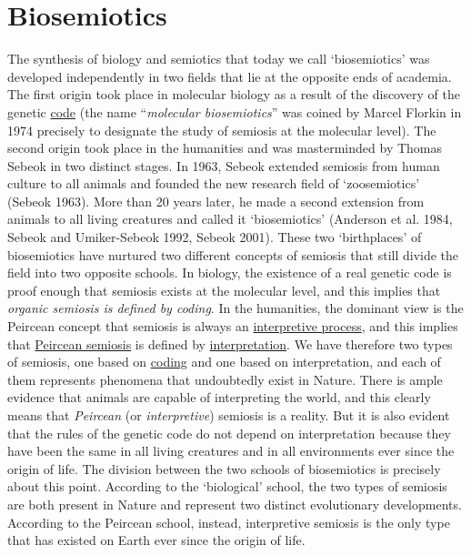 \documentclass[12pt]{article}
\begin{document}
\section{Biosemiotics}
The synthesis of biology and semiotics that today we call `biosemiotics' was developed independently in two fields that lie at the opposite ends of academia. The first origin took place in molecular biology as a result of the discovery of the genetic \hyperlink{code}{code} (the name ``\textit{molecular biosemiotics}'' was coined by Marcel Florkin in 1974 precisely to designate the study of semiosis at the molecular level). The second origin took place in the humanities and was masterminded by Thomas Sebeok in two distinct stages. In 1963, Sebeok extended semiosis from human culture to all animals and founded the new research field of `zoosemiotics' (Sebeok 1963). More than 20 years later, he made a second extension from animals to all living creatures and called it `biosemiotics' (Anderson et al. 1984, Sebeok and Umiker-Sebeok 1992, Sebeok 2001). These two `birthplaces' of biosemiotics have nurtured two different concepts of semiosis that still divide the field into two opposite schools. In biology, the existence of a real genetic code is proof enough that semiosis exists at the molecular level, and this implies that \textit{organic semiosis is defined by coding}. In the humanities, the dominant view is the Peircean concept that semiosis is always an \hyperlink{interpretive_semiosis}{interpretive process}, and this implies that \hyperlink{peirce_model_of_semiosis}{Peircean semiosis} is defined by \hyperlink{interpretation}{interpretation}. We have therefore two types of semiosis, one based on \hyperlink{copying_and_coding}{coding} and one based on interpretation, and each of them represents phenomena that undoubtedly exist in Nature. There is ample evidence that animals are capable of interpreting the world, and this clearly means that \textit{Peircean} (or \textit{interpretive}) semiosis is a reality. But it is also evident that the rules of the genetic code do not depend on interpretation because they have been the same in all living creatures and in all environments ever since the origin of life. The division between the two schools of biosemiotics is precisely about this point. According to the `biological' school, the two types of semiosis are both present in Nature and represent two distinct evolutionary developments. According to the Peircean school, instead, interpretive semiosis is the only type that has existed on Earth ever since the origin of life. 
\end{document}
